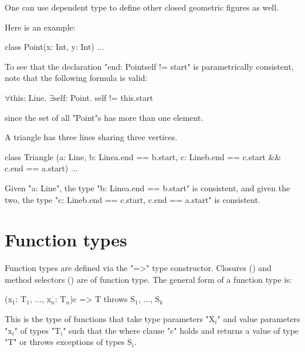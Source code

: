 One can use dependent type to define other closed geometric figures as well.

\begin{example}
Here is an example:
\begin{xten}
class Point(x: Int, y: Int) {...}
\end{xten}


To see that the declaration \xcd"end: Point{self != start}" is
parametrically consistent, note that the following formula is valid:
\begin{xtenmath}
$\forall$this: Line. $\exists$self: Point. self != this.start  
\end{xtenmath}
\noindent since the set of all \xcd"Point"s has more than one element.
\end{example}

\begin{example}
A triangle has three lines sharing three vertices.
\begin{xten}
class Triangle 
 (a: Line, 
  b: Line{a.end == b.start}, 
  c: Line{b.end == c.start && c.end == a.start}) 
 { ... }
\end{xten}


Given \xcd"a: Line", the type \xcd"b: Line{a.end == b.start}" is consistent,
and
given the two, the type \xcd"c: Line{b.end == c.start, c.end == a.start}"
is consistent.

\end{example}

\section{Function types}
\label{FunctionTypes}




        Function types are defined via the \xcd"=>" type
        constructor.  Closures () and method
        selectors () are of function type.
        The general form of a function type is:
\begin{xtenmath}
[X$_1$, $\dots$, X$_m$](x$_1$: T$_1$, $\dots$, x$_n$: T$_n$){c} => T
        throws S$_1$, $\dots$, S$_k$
\end{xtenmath}
        This
        is the type of functions that take type parameters
        \xcdmath"X$_i$"
        and value parameters
        \xcdmath"x$_i$"
        of types
        \xcdmath"T$_i$"
        such that the where clause \xcd"c" holds
        and returns a value of type \xcd"T" or throws
        exceptions of 
        types S$_i$.

